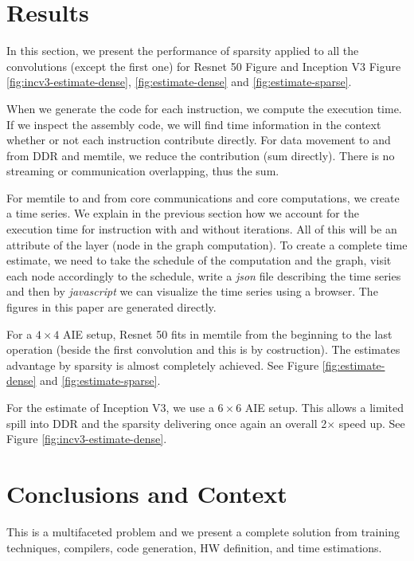 \documentclass[conference]{IEEEtran}
\begin{document}
\section{Results}
\label{sec:experiments}
In this section, we present the performance of sparsity applied to all
the convolutions (except the first one) for Resnet 50 Figure and
Inception V3 Figure \ref{fig:incv3-estimate-dense},
\ref{fig:estimate-dense} and \ref{fig:estimate-sparse}.


When we generate the code for each instruction, we compute the
execution time. If we inspect the assembly code, we will find time
information in the context whether or not each instruction contribute
directly. For data movement to and from DDR and memtile, we reduce the
contribution (sum directly). There is no streaming or communication
overlapping, thus the sum.

For memtile to and from core communications and core computations, we
create a time series. We explain in the previous section how we
account for the execution time for instruction with and without
iterations. All of this will be an attribute of the layer (node in the
graph computation).  To create a complete time estimate, we need to
take the schedule of the computation and the graph, visit each node
accordingly to the schedule, write a {\em json} file describing the
time series and then by {\em javascript} we can visualize the time
series using a browser. The figures in this paper are generated
directly.

For a $4\times 4$ AIE setup, Resnet 50 fits in memtile from the
beginning to the last operation (beside the first convolution and this
is by costruction). The estimates advantage by sparsity is almost
completely achieved.  See Figure \ref{fig:estimate-dense} and
\ref{fig:estimate-sparse}.

For the estimate of Inception V3, we use a $6\times 6$ AIE setup.
This allows a limited spill into DDR and the sparsity delivering once
again an overall 2$\times$ speed up. See Figure
\ref{fig:incv3-estimate-dense}.









\section{Conclusions and Context}
This is a multifaceted problem and we present a complete solution from
training techniques, compilers, code generation, HW definition, and
time estimations.
\end{document}
